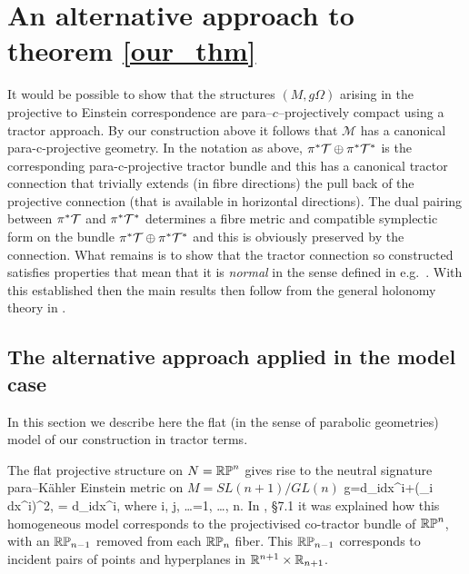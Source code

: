 \section{An alternative approach to theorem \ref{our_thm}}


It would be possible to show that the structures $(M,g\Omega)$ arising in the projective to Einstein correspondence are para--$c$--projectively compact using a tractor approach. By our construction above it follows that $\mathcal{M}$ has a canonical para-c-projective geometry. In the notation as above, $\pi^*{\mathcal{T}}\oplus
\pi^*{\mathcal{T}^*}$ is the corresponding para-c-projective tractor bundle
and this has a canonical tractor connection that trivially
extends (in fibre directions) the pull back of the projective
connection (that is available in horizontal directions). The
dual pairing between $\pi^*{\mathcal{T}}$ and $\pi^*{\mathcal{T}^*}$ determines a
fibre metric and compatible symplectic form on the bundle
$\pi^*{\mathcal{T}}\oplus \pi^*{\mathcal{T}^*}$ and this is obviously preserved by the
connection. What remains is to show that the tractor connection so
constructed satisfies properties that mean that it is {\em normal} in
the sense defined in e.g.\ \cite{CS-book}. With this established then
the main results then follow from the general holonomy theory in
\cite{CGH-duke}.


\subsection{The alternative approach applied in the model case}


In this section we describe here the flat (in the sense of parabolic
geometries) model \cite{CDT13, DM} of our construction in tractor
terms.

The flat projective structure on $N=\mathbb{RP}^n$ gives rise to 
the neutral signature para--K\"ahler Einstein metric on $M=SL(n+1)/GL(n)$
\be
\label{DM_metric}
g=d\xi_i\odot dx^i+(\xi_i dx^i)^2, \quad \Omega= d\xi_i\wedge dx^i, \quad\mbox{where}\quad
i, j, \dots =1, \dots, n.
\ee
In \cite{DM}, \S 7.1 it was explained how this homogeneous model
corresponds to the projectivised co-tractor bundle of $\mathbb{RP}^n$, with
an $\mathbb{RP}_{n-1}$ removed from each $\mathbb{RP}_n$ fiber. This $\mathbb{RP}_{n-1}$
corresponds to incident pairs of points and hyperplanes in $\mathbb{R}^{n+1}\times\mathbb{R}_{n+1}$.


